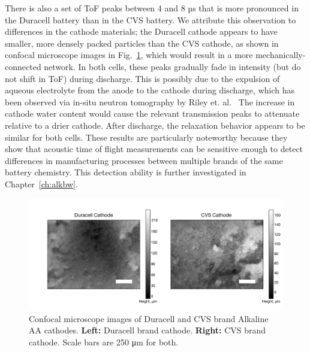 There is also a set of ToF peaks between 4 and 8 µs that is more pronounced in the Duracell battery than in the CVS battery. We attribute this observation to differences in the cathode materials; the Duracell cathode appears to have smaller, more densely packed particles than the CVS cathode, as shown in confocal microscope images in Fig.~\ref{fig:bwcathode}, which would result in a more mechanically-connected network. In both cells, these peaks gradually fade in intensity (but do not shift in ToF) during discharge. This is possibly due to the expulsion of aqueous electrolyte from the anode to the cathode during discharge, which has been observed via in-situ neutron tomography by Riley et. al.~\cite{Riley2010-ur} The increase in cathode water content would cause the relevant transmission peaks to attenuate relative to a drier cathode. After discharge, the relaxation behavior appears to be similar for both cells. These results are particularly noteworthy because they show that acoustic time of flight measurements can be sensitive enough to detect differences in manufacturing processes between multiple brands of the same battery chemistry. This detection ability is further investigated in Chapter~\ref{ch:alkbw}.

\begin{figure}[htb]
  \centering
    \includegraphics[width=\textwidth]{ch4-bw/images/cathode.png}
    \caption[Confocal microscope images of Duracell and CVS brand Alkaline AA cathodes.]{Confocal microscope images of Duracell and CVS brand Alkaline AA cathodes. \textbf{Left:} Duracell brand cathode. \textbf{Right:} CVS brand cathode. Scale bars are 250 μm for both.}
    \label{fig:bwcathode}
\end{figure}

